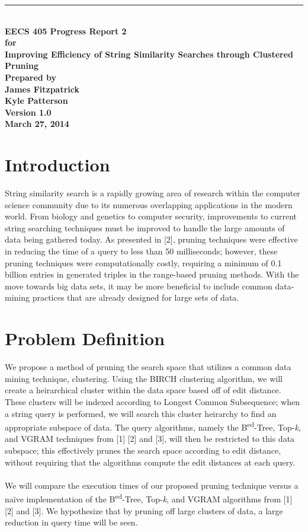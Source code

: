 \documentclass[pdftex,12pt,letter]{article}
\newcommand{\HRule}{\rule{\linewidth}{0.5mm}}
\begin{document}
\begin{titlepage}
\begin{flushright}
\HRule \\[0.4cm]
{ \bfseries
{\huge EECS 405 Progress Report 2\\[1cm]}
{\Large for\\[1cm]}
{\large Improving Efficiency of String Similarity Searches through Clustered Pruning\\[3cm]}
{\large Prepared by\\[1cm]James Fitzpatrick\\Kyle Patterson\\[2cm]
Version 1.0\\
March 27, 2014\\
}}
\end{flushright}
\end{titlepage}

\tableofcontents
\newpage

\section{Introduction}
String similarity search is a rapidly growing area of research within the computer science community due to its numerous overlapping applications in the modern world. From biology and genetics to computer security, improvements to current string searching techniques must be improved to handle the large amounts of data being gathered today.  As presented in [2], pruning techniques were effective in reducing the time of a query to less than 50 milliseconds; however, these pruning techniques were computationally costly, requiring a minimum of 0.1 billion entries in generated triples in the range-based pruning methods. With the move towards big data sets, it may be more beneficial to include common data-mining practices that are already designed for large sets of data.

\section{Problem Definition}
We propose a method of pruning the search space that utilizes a common data mining technique, clustering. Using the BIRCH clustering algorithm, we will create a heirarchical cluster within the data space based off of edit distance. These clusters will be indexed according to Longest Common Subsequence; when a string query is performed, we will search this cluster heirarchy to find an appropriate subspace of data. The query algorithms, namely the B\textsuperscript{ed}-Tree, Top-\textit{k}, and VGRAM techniques from [1] [2] and [3], will then be restricted to this data subspace; this effectively prunes the search space according to edit distance, without requiring that the algorithms compute the edit distances at each query. \\
\\
We will compare the execution times of our proposed pruning technique versus a na\"{i}ve implementation of the B\textsuperscript{ed}-Tree, Top-\textit{k}, and VGRAM algorithms from [1] [2] and [3]. We hypothesize that by pruning off large clusters of data, a large reduction in query time will be seen.
\end{document}
